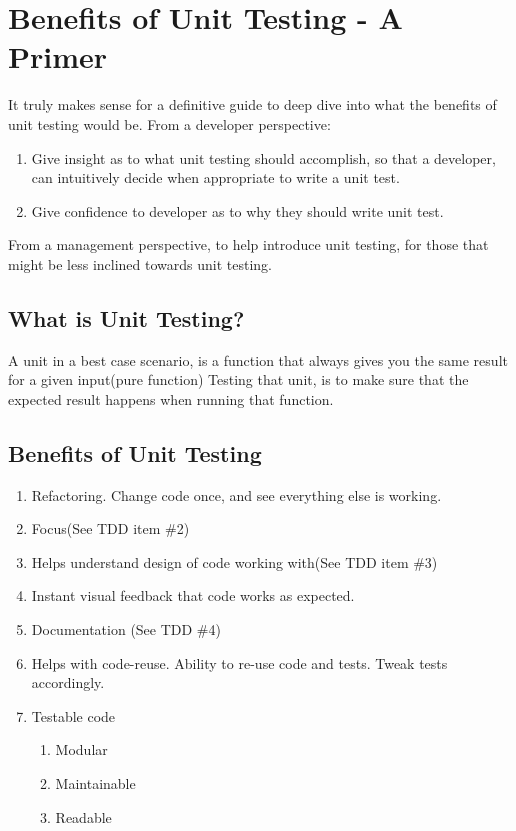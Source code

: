 \maketitle{}
\section{ Benefits of Unit Testing - A Primer }
It truly makes sense for a definitive guide to deep dive into what the benefits
of unit testing would be. From a developer perspective:
\begin{enumerate}
  \item Give insight as to what unit testing should accomplish, so that a
  developer, can intuitively decide when appropriate to write a unit test.
  \item Give confidence to developer as to why they should write unit test.
\end{enumerate}

From a management perspective, to help introduce unit testing, for those that
might be less inclined towards unit testing.

\subsection{What is Unit Testing?}
A unit in a best case scenario, is a function that always gives you the same
result for a given input(pure function) Testing that unit, is to make sure that
the expected result happens when running that function.

\subsection{Benefits of Unit Testing}
\begin{enumerate}
  \item Refactoring. Change code once, and see everything else is working.
  \item Focus(See TDD item \#2)
  \item Helps understand design of code working with(See TDD item \#3)
  \item Instant visual feedback that code works as expected.
  \item Documentation (See TDD \#4)
  \item Helps with code-reuse. Ability to re-use code and tests. Tweak tests
  accordingly.
  \item Testable code
    \begin{enumerate}
      \item Modular
      \item Maintainable
      \item Readable
    \end{enumerate}
\end{enumerate}

